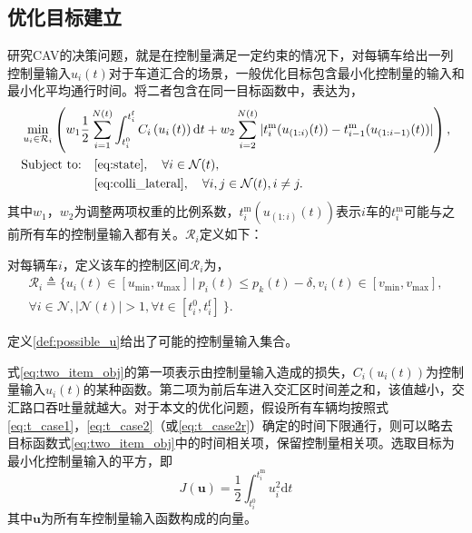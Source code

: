 \subsection{优化目标建立}
研究CAV的决策问题，就是在控制量满足一定约束的情况下，对每辆车给出一列控制量输入$u_i(t)$对于车道汇合的场景，一般优化目标包含最小化控制量的输入和最小化平均通行时间。\cite{Rios2016Automated}将二者包含在同一目标函数中，表达为，
\begin{equation}
\begin{aligned}
&\min_{u_i\in \mathcal{R}_i}\left(w_1\frac12\sum^{N(t)}_{i=1}\int_{t_i^0}^{t_i^\mathrm{f}}C_i\left(u_i\left(t\right)\right)\mathrm{d}t + w_2\sum_{i=2}^{N(t)}|t_i^\mathrm{m}(u_{(1:i)}(t))-t_{i-1}^\mathrm{m}(u_{(1:i-1)}(t))|\right),\\
&
\begin{aligned}
\text{Subject to:} & \quad \mbox{\ref{eq:state}}, \quad \forall i\in \mathcal{N}(t),\\
& \quad \mbox{\ref{eq:colli_lateral}}, \quad \forall i,j \in \mathcal{N}(t), i\neq j.
\end{aligned}
\end{aligned}
\label{eq:two_item_obj}
\end{equation}
其中$w_1$，$w_2$为调整两项权重的比例系数，$t_i^\mathrm{m}(u_{(1:i)}(t))$表示$i$车的$t_i^\mathrm{m}$可能与之前所有车的控制量输入都有关。$\mathcal{R}_i$定义如下：
\begin{definition}
对每辆车$i$，定义该车的{\heiti 控制区间}$\mathcal{R}_i$为，
\begin{equation}
\begin{gathered}
\mathcal{R}_i\triangleq\{u_i(t)\in[u_{\min}, u_{\max}]\ |\ p_i(t)\leq p_k(t)-\delta, v_i(t)\in[v_{\min}, v_{\max}],\\
\forall i \in \mathcal{N}, |\mathcal{N}(t)|>1, \forall t \in [t_i^0, t_i^\mathrm{f}]\ \}.
\end{gathered}
\end{equation}
\label{def:possible_u}
\end{definition}
定义\ref{def:possible_u}给出了可能的控制量输入集合。

式\ref{eq:two_item_obj}的第一项表示由控制量输入造成的损失，$C_i(u_i(t))$为控制量输入$u_i(t)$的某种函数。第二项为前后车进入交汇区时间差之和，该值越小，交汇路口吞吐量就越大。对于本文的优化问题，假设所有车辆均按照式\ref{eq:t_case1}，\ref{eq:t_case2}（或\ref{eq:t_case2r}）确定的时间下限通行，则可以略去目标函数式\ref{eq:two_item_obj}中的时间相关项，保留控制量相关项。选取目标为最小化控制量输入的平方\cite{Malikopoulos2016A,Rios2016Automated}，即
\begin{equation}
J(\mathbf{u})=\frac12\int_{t_i^0}^{t_i^\mathrm{m}}u_i^2\mathrm{d}t
\label{eq:one_item_obj}
\end{equation}
其中$\mathbf{u}$为所有车控制量输入函数构成的向量。